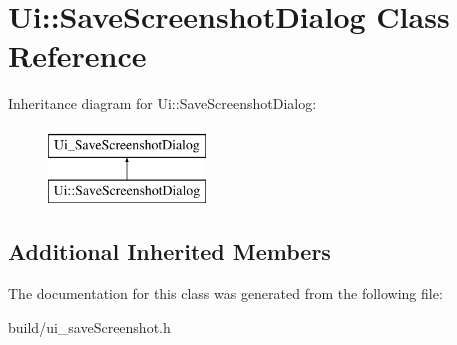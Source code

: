 \hypertarget{class_ui_1_1_save_screenshot_dialog}{}\section{Ui\+:\+:Save\+Screenshot\+Dialog Class Reference}
\label{class_ui_1_1_save_screenshot_dialog}
Inheritance diagram for Ui\+:\+:Save\+Screenshot\+Dialog\+:\begin{figure}[H]
\begin{center}
\leavevmode
\includegraphics[height=2.000000cm]{class_ui_1_1_save_screenshot_dialog}
\end{center}
\end{figure}
\subsection*{Additional Inherited Members}


The documentation for this class was generated from the following file\+:\begin{DoxyCompactItemize}
\item 
build/ui\+\_\+save\+Screenshot.\+h\end{DoxyCompactItemize}
